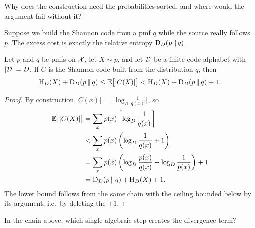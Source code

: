 \begin{yourturn}
Why does the construction need the probabilities sorted, and where would the
argument fail without it?
\ifshowanswers\else\workspace[2]\fi
{}
\end{yourturn}


Suppose we build the Shannon code from a pmf $q$ while the source really follows
$p$. The excess cost is exactly the relative entropy $\mathrm{D}_D(p\,\|\,q)$.

\begin{proposition}\label{prop:mismatched-shannon}
Let $p$ and $q$ be pmfs on $\mathcal{X}$, let $X\sim p$, and let $\mathcal{D}$ be a finite code
alphabet with $|\mathcal{D}|=D$. If $C$ is the Shannon code built from the distribution
$q$, then
\[
  \mathrm{H}_D(X)+\mathrm{D}_D(p\,\|\,q)
  \le\mathbb{E}\bigl[|C(X)|\bigr]
  <\mathrm{H}_D(X)+\mathrm{D}_D(p\,\|\,q)+1 .
\]
\end{proposition}

\begin{proof}
By construction $|C(x)|=\lceil\log_D\frac1{q(x)}\rceil$, so
\[
\begin{aligned}
  \mathbb{E}\bigl[|C(X)|\bigr]
  &=\sum_xp(x)\left\lceil\log_D\frac1{q(x)}\right\rceil\\
  &<\sum_xp(x)\left(\log_D\frac1{q(x)}+1\right)\\
  &=\sum_xp(x)\left(\log_D\frac{p(x)}{q(x)}
    +\log_D\frac1{p(x)}\right)+1\\
  &=\mathrm{D}_D(p\,\|\,q)+\mathrm{H}_D(X)+1 .
\end{aligned}
\]
The lower bound follows from the same chain with the ceiling bounded below by
its argument, i.e.\ by deleting the $+1$.
\end{proof}

\begin{yourturn}
In the chain above, which single algebraic step creates the divergence term?
\ifshowanswers\else\workspace[2]\fi
{}
\end{yourturn}

